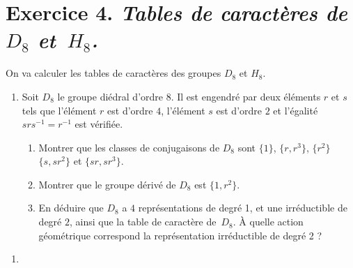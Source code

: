 \documentclass[./main]{subfiles}
\begin{document}
  \section{Exercice 4. \textit{Tables de caractères de $D_8$ et~$H_8$.}}
  \begin{enonce}
    On va calculer les tables de caractères des groupes $D_8$ et $H_8$.
    \begin{enumerate}
      \item Soit $D_8$ le groupe diédral d'ordre $8$. Il est engendré par deux éléments $r$ et $s$ tels que l'élément $r$ est d'ordre $4$, l'élément $s$ est d'ordre $2$ et l'égalité $s r s^{-1} = r^{-1}$ est vérifiée.
        \begin{enumerate}
          \item Montrer que les classes de conjugaisons de $D_8$ sont $\{1\}$, $\{r, r^3\}$, $\{r^2\}$ $\{s, sr^2\}$ et $\{s r, s r^3\}$.
          \item Montrer que le groupe dérivé de $D_8$ est $\{1,r^2\}$.
          \item En déduire que $D_8$ a $4$ représentations de degré 1, et une irréductible de degré $2$, ainsi que la table de caractère de~$D_8$. À quelle action géométrique correspond la représentation irréductible de degré 2 ? 
        \end{enumerate}
    \end{enumerate}
  \end{enonce}

  \begin{enumerate}
    \item
  \end{enumerate}
\end{document}
